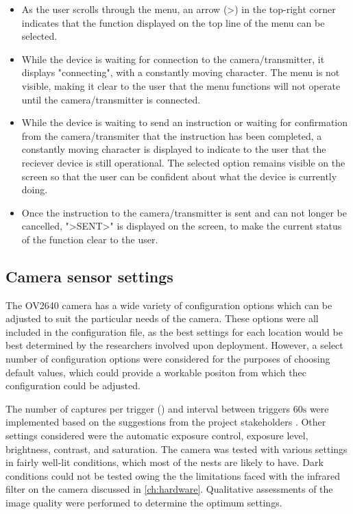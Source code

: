 \documentclass[class=report,11pt,crop=false]{standalone}
\begin{document}
\begin{itemize}
    \item As the user scrolls through the menu, an arrow (>) in the top-right corner indicates that the function displayed on the top line of the menu can be selected.
    \item While the device is waiting for connection to the camera/transmitter, it displays "connecting", with a constantly moving character. The menu is not visible, making it clear to the user that the menu functions will not operate until the camera/transmitter is connected.
    \item While the device is waiting to send an instruction or waiting for confirmation from the camera/transmiter that the instruction has been completed, a constantly moving character is displayed to indicate to the user that the reciever device is still operational. The selected option remains visible on the screen so that the user can be confident about what the device is currently doing.
    \item Once the instruction to the camera/transmitter is sent and can not longer be cancelled, ">SENT>" is displayed on the screen, to make the current status of the function clear to the user.
\end{itemize}

\subsection{Camera sensor settings}

The OV2640 camera has a wide variety of configuration options which can be adjusted to suit the particular needs of the camera. These options were all included in the configuration file, as the best settings for each location would be best determined by the researchers involved upon deployment. However, a select number of configuration options were considered for the purposes of choosing default values, which could provide a workable positon from which thec configuration could be adjusted. 

The number of captures per trigger () and interval between triggers $60 \mathrm{s}$ were implemented based on the suggestions from the project stakeholders \cite{hofmeyer2024private}. Other settings considered were the automatic exposure control, exposure level, brightness, contrast, and saturation. The camera was tested with various settings in fairly well-lit conditions, which most of the nests are likely to have. Dark conditions could not be tested owing the the limitations faced with the infrared filter on the camera discussed in \ref{ch:hardware}. Qualitative assessments of the image quality were performed to determine the optimum settings.
\end{document}
